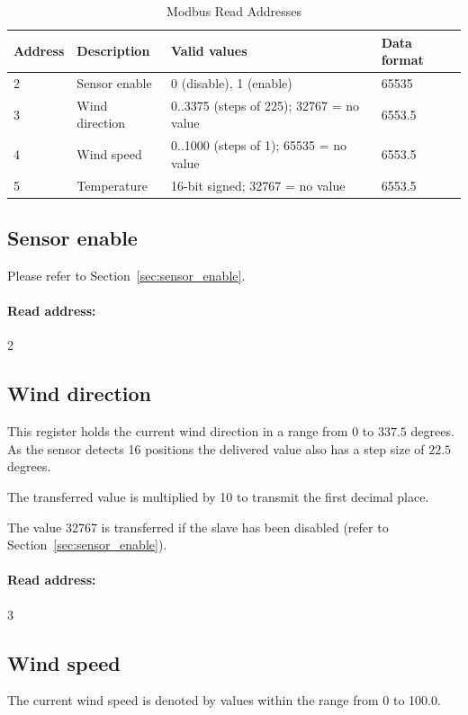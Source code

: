\begin{table}[ht]

    \centering
    \begin{tabular}{|l|l|l|l|}
    \hline \textbf{Address} & \textbf{Description} & \textbf{Valid values} & \textbf{Data format} \\ 
    \hline
    \hline 2 & Sensor enable & 0 (disable), 1 (enable) & 65535 \\ 
    \hline 3 & Wind direction & 0..3375 (steps of 225); 32767 = no value & 6553.5 \\ 
    \hline 4 & Wind speed & 0..1000 (steps of 1); 65535 = no value & 6553.5 \\ 
    \hline 5 & Temperature & 16-bit signed; 32767 = no value & 6553.5 \\ 
    \hline 
    \end{tabular}
    \caption{Modbus Read Addresses}
    \label{tab:modbus_read}
\end{table}

\subsection{Sensor enable}
Please refer to Section~\ref{sec:sensor_enable}.

\paragraph{Read address:} 2

\subsection{Wind direction}
This register holds the current wind direction in a range from $0$ to $337.5$ degrees. As the sensor detects 16 positions the delivered value also has a step size of $22.5$ degrees.

The transferred value is multiplied by 10 to transmit the first decimal place.

The value 32767 is transferred if the slave has been disabled (refer to Section~\ref{sec:sensor_enable}).

\paragraph{Read address:} 3

\subsection{Wind speed}
The current wind speed is denoted by values within the range from 0 to 100.0.

